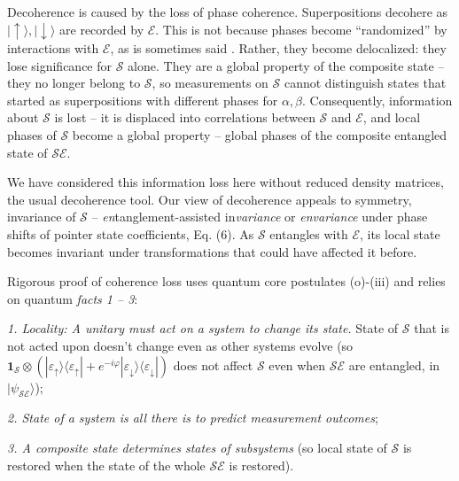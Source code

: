 \documentclass[aps,amsmath,amssymb,amsfonts,floatfix]{revtex4-1}
\newcommand{\ket}[1]    {| #1 \rangle}
\newcommand{\kb}[2]     {| #1 \rangle \! \langle #2 |}
\newcommand{\cS}        {{\mathcal S}}
\newcommand{\cE}        {{\mathcal E}}
\newcommand{\+}         {\dagger}
\newcommand\hocom[1]{}%
\begin{document}
{Decoherence is caused by the loss of phase coherence. Superpositions 
decohere as $\ket \uparrow, \ket \downarrow$ are recorded by $\cE$. 
This is not because phases become ``randomized'' by interactions with $\cE$, as is sometimes said \cite{23}. Rather, 
they become delocalized: they lose significance for $\cS$ alone. They are a global property of the composite state -- they
no longer belong to $\cS$, so measurements on $\cS$ cannot distinguish states that started as superpositions with different phases for $\alpha, \beta$. 
Consequently, information about $\cS$ is lost -- it is displaced into correlations between $\cS$ and $\cE$, and local phases of $\cS$ become a global property -- global phases of the composite entangled state of $\cS\cE$. 

We have considered this information loss here without reduced density matrices, the usual decoherence tool. Our view of decoherence appeals to symmetry, invariance of $\cS$ -- {\it en}tanglement-assisted in{\it variance} or {\it envariance} under phase shifts of pointer state coefficients, Eq. (6). As $\cS$ entangles with $\cE$, its local state becomes invariant under transformations that could have affected it before. 



Rigorous proof of 
coherence loss uses quantum core postulates (o)-(iii) and relies on quantum {\it facts 1 -- 3}:

{\it  1. Locality: A unitary must act on a system to change its state.} State of $\cS$ that is not acted upon doesn't change even as other systems evolve (so ${\mathbf 1}_\cS \otimes (\kb {\varepsilon_\uparrow} {\varepsilon_\uparrow} + e^{-i \varphi} \kb {\varepsilon_\downarrow}{\varepsilon_\downarrow})$
does not affect $\cS$ even when ${\cS\cE}$ are entangled, in $\ket {\psi_{\cS\cE}}$);

{\it 2. State of a system is all there is to predict measurement outcomes}; 

{\it 3. A composite state determines states of subsystems} (so local state of $\cS$ is restored when the state of the whole $\cS\cE$ is restored). 

}
\end{document}
